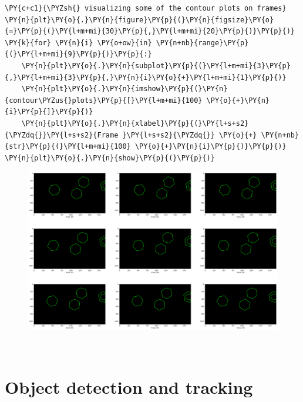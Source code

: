 \documentclass[a4paper,11pt]{article}%
\begin{document}
    \begin{tcolorbox}[breakable, size=fbox, boxrule=1pt, pad at break*=1mm,colback=cellbackground, colframe=cellborder]
\begin{Verbatim}[commandchars=\\\{\}]
\PY{c+c1}{\PYZsh{} visualizing some of the contour plots on frames}
\PY{n}{plt}\PY{o}{.}\PY{n}{figure}\PY{p}{(}\PY{n}{figsize}\PY{o}{=}\PY{p}{(}\PY{l+m+mi}{30}\PY{p}{,}\PY{l+m+mi}{20}\PY{p}{)}\PY{p}{)}
\PY{k}{for} \PY{n}{i} \PY{o+ow}{in} \PY{n+nb}{range}\PY{p}{(}\PY{l+m+mi}{9}\PY{p}{)}\PY{p}{:}
    \PY{n}{plt}\PY{o}{.}\PY{n}{subplot}\PY{p}{(}\PY{l+m+mi}{3}\PY{p}{,}\PY{l+m+mi}{3}\PY{p}{,}\PY{n}{i}\PY{o}{+}\PY{l+m+mi}{1}\PY{p}{)}
    \PY{n}{plt}\PY{o}{.}\PY{n}{imshow}\PY{p}{(}\PY{n}{contour\PYZus{}plots}\PY{p}{[}\PY{l+m+mi}{100} \PY{o}{+}\PY{n}{i}\PY{p}{]}\PY{p}{)}
    \PY{n}{plt}\PY{o}{.}\PY{n}{xlabel}\PY{p}{(}\PY{l+s+s2}{\PYZdq{}}\PY{l+s+s2}{Frame }\PY{l+s+s2}{\PYZdq{}} \PY{o}{+} \PY{n+nb}{str}\PY{p}{(}\PY{l+m+mi}{100} \PY{o}{+}\PY{n}{i}\PY{p}{)}\PY{p}{)}
\PY{n}{plt}\PY{o}{.}\PY{n}{show}\PY{p}{(}\PY{p}{)}
\end{Verbatim}
\end{tcolorbox}

    \begin{figure}[!h]
		\centering
    \includegraphics[scale=0.3]{figures/output_37_0.png}
    \end{figure}
    { \hspace*{\fill} \\}
\pagebreak
    \hypertarget{object-detection-and-tracking}{%
\section{Object detection and
tracking}\label{object-detection-and-tracking}}
\end{document}
